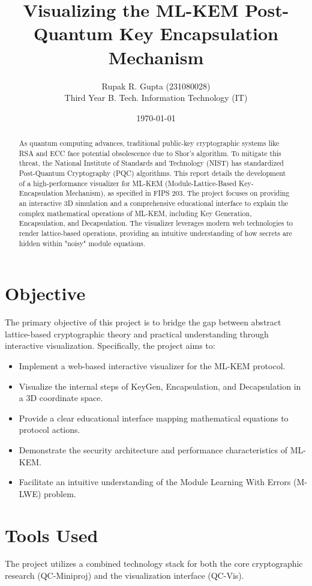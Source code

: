 \documentclass[12pt,a4paper]{article}
\title{Visualizing the ML-KEM Post-Quantum Key Encapsulation Mechanism}
\author{Rupak R. Gupta (231080028) \\ Third Year B. Tech. Information Technology (IT)}
\date{\today}
\begin{document}
\maketitle

\begin{abstract}
As quantum computing advances, traditional public-key cryptographic systems like RSA and ECC face potential obsolescence due to Shor's algorithm. To mitigate this threat, the National Institute of Standards and Technology (NIST) has standardized Post-Quantum Cryptography (PQC) algorithms. This report details the development of a high-performance visualizer for ML-KEM (Module-Lattice-Based Key-Encapsulation Mechanism), as specified in FIPS 203. The project focuses on providing an interactive 3D simulation and a comprehensive educational interface to explain the complex mathematical operations of ML-KEM, including Key Generation, Encapsulation, and Decapsulation. The visualizer leverages modern web technologies to render lattice-based operations, providing an intuitive understanding of how secrets are hidden within "noisy" module equations.
\end{abstract}

\section{Objective}
The primary objective of this project is to bridge the gap between abstract lattice-based cryptographic theory and practical understanding through interactive visualization. Specifically, the project aims to:
\begin{itemize}
    \item Implement a web-based interactive visualizer for the ML-KEM protocol.
    \item Visualize the internal steps of KeyGen, Encapsulation, and Decapsulation in a 3D coordinate space.
    \item Provide a clear educational interface mapping mathematical equations to protocol actions.
    \item Demonstrate the security architecture and performance characteristics of ML-KEM.
    \item Facilitate an intuitive understanding of the Module Learning With Errors (M-LWE) problem.
\end{itemize}

\section{Tools Used}
The project utilizes a combined technology stack for both the core cryptographic research (QC-Miniproj) and the visualization interface (QC-Vis).
\end{document}
